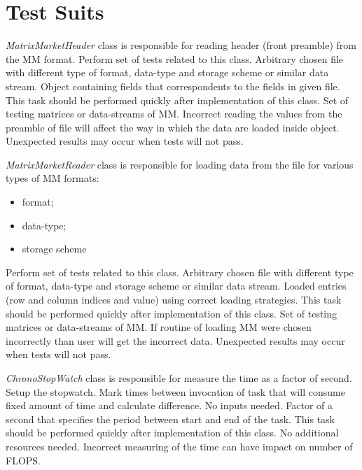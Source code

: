 \chapter{Test Suits} \label{chp:test-suits}
	{
		{
			\emph{MatrixMarketHeader} class is responsible for reading header (front preamble) from the \gls{MM} format.
		}
		{
			Perform set of tests related to this class. 
		}
		{
			Arbitrary chosen file with different type of format, data-type and storage scheme or similar data stream.
		}
		{
			Object containing fields that correspondents to the fields in given file. 
		}
		{
			This task should be performed quickly after implementation of this class.
		}
		{
			Set of testing matrices or data-streams of \gls{MM}.
		}
		{
			Incorrect reading the values from the preamble of file will affect the way in which the data are loaded inside object. Unexpected results may occur when tests will not pass. 
		}
	}
	{
		{
			\emph{MatrixMarketReader} class is responsible for loading data from the file for various types of \gls{MM} formats:
			\begin{itemize}
				\item format;
				\item data-type;
				\item storage scheme
			\end{itemize}
		}
		{
			Perform set of tests related to this class. 
		}
		{
			Arbitrary chosen file with different type of format, data-type and storage scheme or similar data stream. 
		}
		{
			Loaded entries (row and column indices and value) using correct loading strategies. 
		}
		{
			This task should be performed quickly after implementation of this class.
		}
		{
			Set of testing matrices or data-streams of \gls{MM}.
		}
		{
			If routine of loading \gls{MM} were chosen incorrectly than user will get the incorrect data.
			Unexpected results may occur when tests will not pass. 
		}
	}
	\clearpage
	{
		{
			\emph{ChronoStopWatch} class is responsible for measure the time as a factor of second.
		}
		{
			Setup the stopwatch. Mark times between invocation of task that will consume fixed amount of time and calculate difference.
		}
		{
			No inputs needed.
		}
		{
			Factor of a second that specifies the period between start and end of the task.
		}
		{
			This task should be performed quickly after implementation of this class.
		}
		{
			No additional resources needed.
		}
		{
			Incorrect measuring of the time can have impact on number of \gls{FLOPS}.
		}
	}
